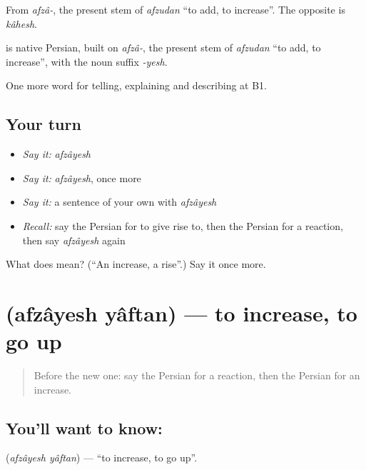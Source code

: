 From \emph{afzâ-}, the present stem of \emph{afzudan} \textquotedblleft{}to add, to increase\textquotedblright{}. The opposite is \emph{kâhesh}.

\begin{cousinweb}
\textbf{} is native Persian, built on \emph{afzâ-}, the present stem of \emph{afzudan} \textquotedblleft{}to add, to increase\textquotedblright{}, with the noun suffix \emph{-yesh}.
\end{cousinweb}

\begin{grammarlens}[title={What you've built}]
One more word for telling, explaining and describing at B1.
\end{grammarlens}

\subsection*{Your turn}
\begin{itemize}
\raggedright
  \item \emph{Say it:} \emph{afzâyesh}
  \item \emph{Say it:} \emph{afzâyesh}, once more
  \item \emph{Say it:} a sentence of your own with \emph{afzâyesh}
  \item \emph{Recall:} say the Persian for to give rise to, then the Persian for a reaction, then say \emph{afzâyesh} again
\end{itemize}

\begin{tcolorbox}[breakable,colback=teal!4,colframe=teal!35!black,title={Before you move on}]
What does  mean? (\textquotedblleft{}An increase, a rise\textquotedblright{}.) Say it once more.
\end{tcolorbox}
\section[\texorpdfstring{\fa{افزایش} \fa{یافتن} (afzâyesh yâftan)}{افزایش یافتن (afzâyesh yâftan)}]{  (afzâyesh yâftan) — to increase, to go up}

\label{lesson:FA-C373-afzayesh-yaftan}



\begin{quote}
Before the new one: say the Persian for a reaction, then the Persian for an increase.
\end{quote}

\subsection*{You'll want to know:  }
\textbf{ } (\emph{afzâyesh yâftan}) — \textquotedblleft{}to increase, to go up\textquotedblright{}.

